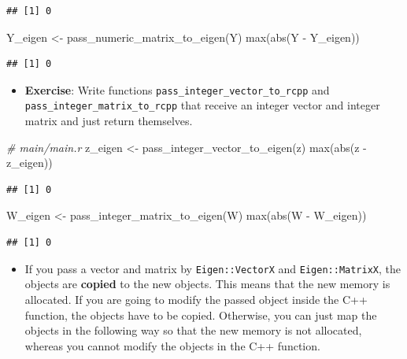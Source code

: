 \documentclass[
]{book}
\newenvironment{Shaded}{\begin{snugshade}}{\end{snugshade}}
\newcommand{\CommentTok}[1]{\textcolor[rgb]{0.56,0.35,0.01}{\textit{#1}}}
\newcommand{\FunctionTok}[1]{\textcolor[rgb]{0.00,0.00,0.00}{#1}}
\newcommand{\NormalTok}[1]{#1}
\newcommand{\OtherTok}[1]{\textcolor[rgb]{0.56,0.35,0.01}{#1}}
\newcommand{\SpecialCharTok}[1]{\textcolor[rgb]{0.00,0.00,0.00}{#1}}
\providecommand{\tightlist}{%
  \setlength{\itemsep}{0pt}\setlength{\parskip}{0pt}}
\begin{document}
\begin{verbatim}
## [1] 0
\end{verbatim}

\begin{Shaded}
\begin{Highlighting}[]
\NormalTok{Y\_eigen }\OtherTok{\textless{}{-}} \FunctionTok{pass\_numeric\_matrix\_to\_eigen}\NormalTok{(Y)}
\FunctionTok{max}\NormalTok{(}\FunctionTok{abs}\NormalTok{(Y }\SpecialCharTok{{-}}\NormalTok{ Y\_eigen))}
\end{Highlighting}
\end{Shaded}

\begin{verbatim}
## [1] 0
\end{verbatim}

\begin{itemize}
\tightlist
\item
  \textbf{Exercise}: Write functions \texttt{pass\_integer\_vector\_to\_rcpp} and \texttt{pass\_integer\_matrix\_to\_rcpp} that receive an integer vector and integer matrix and just return themselves.
\end{itemize}

\begin{Shaded}
\begin{Highlighting}[]
\CommentTok{\# main/main.r}
\NormalTok{z\_eigen }\OtherTok{\textless{}{-}} \FunctionTok{pass\_integer\_vector\_to\_eigen}\NormalTok{(z)}
\FunctionTok{max}\NormalTok{(}\FunctionTok{abs}\NormalTok{(z }\SpecialCharTok{{-}}\NormalTok{ z\_eigen))}
\end{Highlighting}
\end{Shaded}

\begin{verbatim}
## [1] 0
\end{verbatim}

\begin{Shaded}
\begin{Highlighting}[]
\NormalTok{W\_eigen }\OtherTok{\textless{}{-}} \FunctionTok{pass\_integer\_matrix\_to\_eigen}\NormalTok{(W)}
\FunctionTok{max}\NormalTok{(}\FunctionTok{abs}\NormalTok{(W }\SpecialCharTok{{-}}\NormalTok{ W\_eigen))}
\end{Highlighting}
\end{Shaded}

\begin{verbatim}
## [1] 0
\end{verbatim}

\begin{itemize}
\tightlist
\item
  If you pass a vector and matrix by \texttt{Eigen::VectorX} and \texttt{Eigen::MatrixX}, the objects are \textbf{copied} to the new objects. This means that the new memory is allocated. If you are going to modify the passed object inside the C++ function, the objects have to be copied. Otherwise, you can just map the objects in the following way so that the new memory is not allocated, whereas you cannot modify the objects in the C++ function.
\end{itemize}
\end{document}
